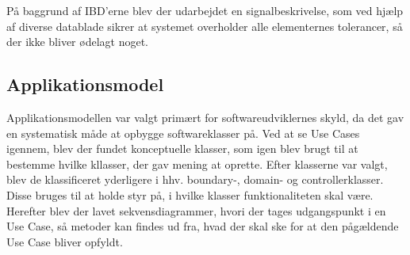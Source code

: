 På baggrund af IBD'erne blev der udarbejdet en signalbeskrivelse, som ved hjælp af diverse datablade sikrer at systemet overholder alle elementernes tolerancer, så der ikke bliver ødelagt noget.

\subsection{Applikationsmodel}

Applikationsmodellen var valgt primært for softwareudviklernes skyld, da det gav en systematisk måde at opbygge softwareklasser på. Ved at se Use Cases igennem, blev der fundet konceptuelle klasser, som igen blev brugt til at bestemme hvilke kllasser, der gav mening at oprette. Efter klasserne var valgt, blev de klassificeret yderligere i hhv. boundary-, domain- og controllerklasser. Disse bruges til at holde styr på, i hvilke klasser funktionaliteten skal være.
Herefter blev der lavet sekvensdiagrammer, hvori der tages udgangspunkt i en Use Case, så metoder kan findes ud fra, hvad der skal ske for at den pågældende Use Case bliver opfyldt.

\clearpage